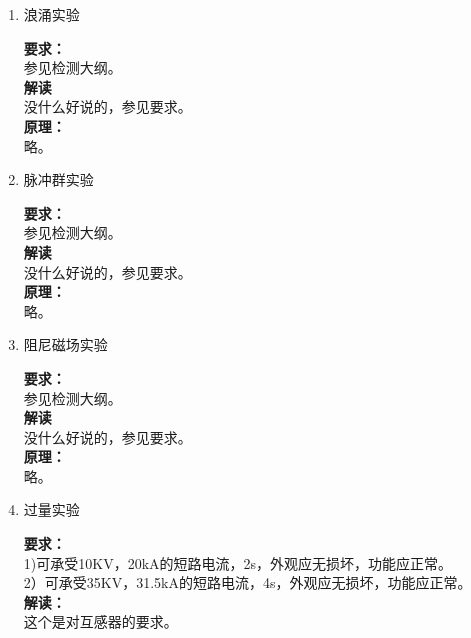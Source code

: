 \documentclass{article}
\begin{document}
\begin{CJK}{UTF8}{gbsn}
\begin{enumerate}
\item 浪涌实验
	\par
	\textbf{要求：}\\
	参见检测大纲。\\
	\textbf{解读}\\
	没什么好说的，参见要求。\\
	\textbf{原理：}\\
	略。

\item 脉冲群实验
	\par
	\textbf{要求：}\\
	参见检测大纲。\\
	\textbf{解读}\\
	没什么好说的，参见要求。\\
	\textbf{原理：}\\
	略。

\item 阻尼磁场实验
	\par
	\textbf{要求：}\\
	参见检测大纲。\\
	\textbf{解读}\\
	没什么好说的，参见要求。\\
	\textbf{原理：}\\
	略。

\item 过量实验
	\par
	\textbf{要求：}\\
	1)可承受10KV，20kA的短路电流，2s，外观应无损坏，功能应正常。\\
	2）可承受35KV，31.5kA的短路电流，4s，外观应无损坏，功能应正常。\\
	\textbf{解读：}\\
	这个是对互感器的要求。


\end{enumerate}
\end{CJK}
\end{document}
